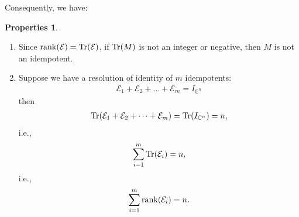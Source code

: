 \documentclass{book}
\theoremstyle{definition}
\newtheorem{prop}{Properties}[section]
\newcommand{\E}{\mathcal{E}}
\begin{document}
Consequently, we have:
\begin{prop}
	\begin{enumerate}
	\item Since $\rank(\E) = \Tr(\E)$, if $\Tr(M)$ is not an integer or negative, then $M$ is not an idempotent.
	
	\item Suppose we have a resolution of identity of $m$ idempotents: 
	\begin{align*}
	\E_1 + \E_2 + \dots + \E_m = I_{\mathbb{C}^n}
	\end{align*}
	then 
	\begin{align*}
	\Tr(\E_1 + \E_2 + \dots + \E_m) = \Tr(I_{\mathbb{C}^n}) = n,
	\end{align*}
	i.e.,
	\begin{align*}
	\sum_{i=1}^m \Tr(\E_i) = n,
	\end{align*}
	i.e.,
	\begin{align*}
	\sum_{i=1}^m \rank(\E_i) = n.
	\end{align*}
	
	
	

\end{enumerate}
\end{prop}
\end{document}

